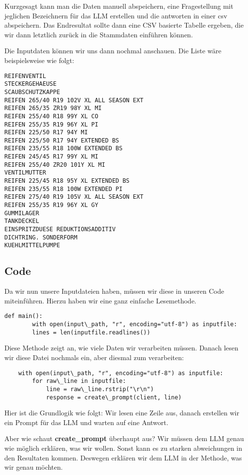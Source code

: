Kurzgesagt kann man die Daten manuell abspeichern, eine Fragestellung mit jeglichen
Bezeichnern für das LLM erstellen und die antworten in einer csv abspeichern.
Das Endresultat sollte dann eine CSV basierte Tabelle ergeben, die wir dann
letztlich zurück in die Stammdaten einführen können.

Die Inputdaten können wir uns dann nochmal anschauen. Die Liste wäre beispielsweise wie folgt:

\begin{lstlisting}
REIFENVENTIL
STECKERGEHAEUSE
SCAUBSCHUTZKAPPE
REIFEN 265/40 R19 102V XL ALL SEASON EXT
REIFEN 265/35 ZR19 98Y XL MI
REIFEN 255/40 R18 99Y XL CO
REIFEN 255/35 R19 96Y XL PI
REIFEN 225/50 R17 94Y MI
REIFEN 225/50 R17 94Y EXTENDED BS
REIFEN 235/55 R18 100W EXTENDED BS
REIFEN 245/45 R17 99Y XL MI
REIFEN 255/40 ZR20 101Y XL MI
VENTILMUTTER
REIFEN 225/45 R18 95Y XL EXTENDED BS
REIFEN 235/55 R18 100W EXTENDED PI
REIFEN 275/40 R19 105V XL ALL SEASON EXT
REIFEN 255/35 R19 96Y XL GY
GUMMILAGER
TANKDECKEL
EINSPRITZDUESE REDUKTIONSADDITIV
DICHTRING. SONDERFORM
KUEHLMITTELPUMPE
\end{lstlisting}

\subsection{Code}

Da wir nun unsere Inputdateien haben, müssen wir diese in unseren Code miteinführen.
Hierzu haben wir eine ganz einfache Lesemethode.

\begin{lstlisting}
def main():
        with open(input\_path, "r", encoding="utf-8") as inputfile:
        lines = len(inputfile.readlines())
\end{lstlisting}

Diese Methode zeigt an, wie viele Daten wir verarbeiten müssen.
Danach lesen wir diese Datei nochmals ein, aber diesmal zum verarbeiten:

\begin{lstlisting}
    with open(input\_path, "r", encoding="utf-8") as inputfile:
        for raw\_line in inputfile:
            line = raw\_line.rstrip("\r\n")
            response = create\_prompt(client, line)
\end{lstlisting}

Hier ist die Grundlogik wie folgt: Wir lesen eine Zeile aus,
danach erstellen wir ein Prompt für das LLM und warten auf eine Antwort.

Aber wie schaut \textbf{create\_prompt} überhaupt aus?
Wir müssen dem LLM genau wie möglich erklären, was wir wollen.
Sonst kann es zu starken abweichungen in den Resultaten kommen.
Deswegen erklären wir dem LLM in der Methode, was wir genau möchten.

